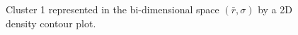 \documentclass{bmcart}
\begin{document}
\begin{backmatter}
\begin{figure}[h!]
	\centering
	\caption{Cluster 1 represented in the bi-dimensional space $(\bar{r},\sigma)$ by a 2D density contour plot.}
	\label{fig:KMCentroid1}
\end{figure}


\end{backmatter}
\end{document}
